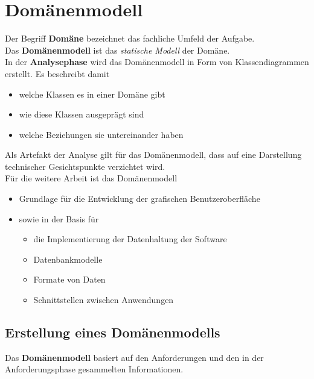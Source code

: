 \section{Domänenmodell}

\noindent
Der Begriff \textbf{Domäne} bezeichnet das fachliche Umfeld der Aufgabe.\\

\noindent
Das \textbf{Domänenmodell} ist das \textit{statische Modell} der Domäne.\\

\noindent
In der \textbf{Analysephase} wird das Domänenmodell in Form von Klassendiagrammen erstellt.
Es beschreibt damit


\begin{itemize}
    \item welche Klassen es in einer Domäne gibt
    \item wie diese Klassen ausgeprägt sind
    \item welche Beziehungen sie untereinander haben
\end{itemize}

\noindent
Als Artefakt der Analyse gilt für das Domänenmodell, dass auf eine Darstellung technischer Gesichtspunkte verzichtet wird.\\

\noindent
Für die weitere Arbeit ist das Domänenmodell

\begin{itemize}
    \item Grundlage für die Entwicklung der grafischen Benutzeroberfläche
    \item sowie in der  Basis für
        \begin{itemize}
            \item die Implementierung der Datenhaltung der Software
            \item Datenbankmodelle
            \item Formate von Daten
            \item Schnittstellen zwischen Anwendungen
        \end{itemize}
\end{itemize}

\subsection{Erstellung eines Domänenmodells}
Das \textbf{Domänenmodell} basiert auf den Anforderungen und den in der Anforderungsphase gesammelten Informationen.\\

